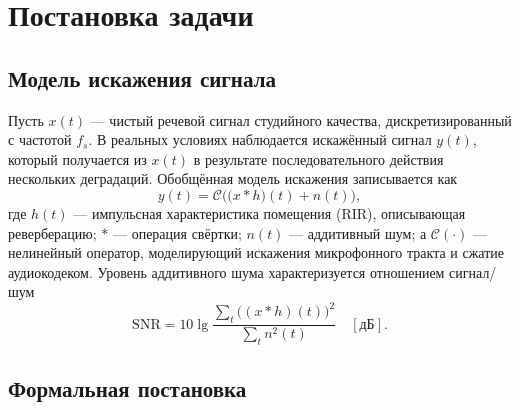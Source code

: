 \section{Постановка задачи}
\label{sec:Chapter1} 

\subsection{Модель искажения сигнала}

Пусть $x(t)$ --- чистый речевой сигнал студийного качества, дискретизированный
с частотой $f_s$. В реальных условиях наблюдается искажённый сигнал $y(t)$,
который получается из $x(t)$ в результате последовательного действия нескольких
деградаций. Обобщённая модель искажения записывается как
\begin{equation}
    y(t) = \mathcal{C}\Big( \big(x * h\big)(t) + n(t) \Big),
    \label{eq:degradation}
\end{equation}
где $h(t)$ --- импульсная характеристика помещения (RIR), описывающая
реверберацию; $*$ --- операция свёртки; $n(t)$ --- аддитивный шум; а
$\mathcal{C}(\cdot)$ --- нелинейный оператор, моделирующий искажения
микрофонного тракта и сжатие аудиокодеком. Уровень аддитивного шума
характеризуется отношением сигнал/шум
\begin{equation}
    \mathrm{SNR} = 10 \lg \frac{\sum_t \big((x*h)(t)\big)^2}{\sum_t n^2(t)}
    \quad [\text{дБ}].
    \label{eq:snr}
\end{equation}

\subsection{Формальная постановка}

